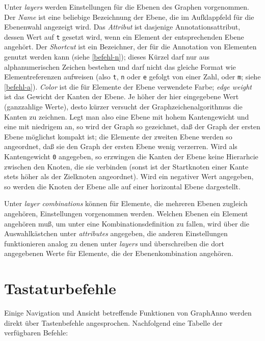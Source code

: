 \documentclass[12pt]{scrartcl}
\begin{document}
Unter \textit{layers} werden Einstellungen für die Ebenen des Graphen vorgenommen. Der \textit{Name} ist eine beliebige Bezeichnung der Ebene, die im Aufklappfeld für die Ebenenwahl angezeigt wird. Das \textit{Attribut} ist dasjenige Annotationsattribut, dessen Wert auf \texttt{t} gesetzt wird, wenn ein Element der entsprechenden Ebene angehört. Der \textit{Shortcut} ist ein Bezeichner, der für die Annotation von Elementen genutzt werden kann (siehe \ref{befehl-n}); dieses Kürzel darf nur aus alphanumerischen Zeichen bestehen und darf nicht das gleiche Format wie Elementreferenzen aufweisen (also \texttt{t}, \texttt{n} oder \texttt{e} gefolgt von einer Zahl, oder  \texttt{m}; siehe \ref{befehl-a}). \textit{Color} ist die für Elemente der Ebene verwendete Farbe; \textit{edge weight} ist das Gewicht der Kanten der Ebene. Je höher der hier eingegebene Wert (ganzzahlige Werte), desto kürzer versucht der Graphzeichenalgorithmus die Kanten zu zeichnen. Legt man also eine Ebene mit hohem Kantengewicht und eine mit niedrigem an, so wird der Graph so gezeichnet, daß der Graph der ersten Ebene möglichst kompakt ist; die Elemente der zweiten Ebene werden so angeordnet, daß sie den Graph der ersten Ebene wenig verzerren. Wird als Kantengewicht \texttt{0} angegeben, so erzwingen die Kanten der Ebene keine Hierarhcie zwischen den Knoten, die sie verbinden (sonst ist der Startknoten einer Kante stets höher als der Zielknoten angeordnet). Wird ein negativer Wert angegeben, so werden die Knoten der Ebene alle auf einer horizontal Ebene dargestellt.

Unter \textit{layer combinations} können für Elemente, die mehreren Ebenen zugleich angehören, Einstellungen vorgenommen werden. Welchen Ebenen ein Element angehören muß, um unter eine Kombinationsdefinition zu fallen, wird über die Auswahlkästchen unter \textit{attributes} angegeben, die anderen Einstellungen funktionieren analog zu denen unter \textit{layers} und überschreiben die dort angegebenen Werte für Elemente, die der Ebenenkombination angehören.


\section{Tastaturbefehle}

Einige Navigation und Ansicht betreffende Funktionen von GraphAnno werden direkt über Tastenbefehle angesprochen. Nachfolgend eine Tabelle der verfügbaren Befehle:
\end{document}
